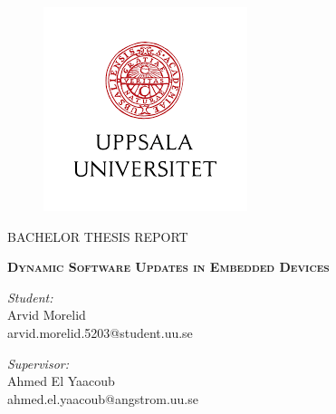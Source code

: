 
\begin{titlepage}

    \begin{figure}
        \begin{center}
            \includegraphics[scale=0.5]{img/UU_LOGO.png}
        \end{center}
    \end{figure}
    
    \thispagestyle{fancy}
    
    \vspace{1in}
    
    \center
    
    \textsc{\large BACHELOR THESIS REPORT} %
    
    \vspace{0.5in}
    
    \noindent\makebox[\linewidth]{\rule{\linewidth}{1.2pt}}
    \textsc{ \textbf{\large 
    Dynamic Software Updates in Embedded Devices
    }}
    \noindent\makebox[\linewidth]{\rule{\linewidth}{1.2pt}}
    
    \vspace{0.5in}
    
    \begin{minipage}{0.48\textwidth}
        \begin{flushleft}
            \textit{Student:} \\
            Arvid Morelid    \\
            arvid.morelid.5203@student.uu.se \\
        \end{flushleft}
    \end{minipage}
    \begin{minipage}{0.48\textwidth}
        \begin{flushright}
        \textit{Supervisor:} \\
        Ahmed El Yaacoub \\
        ahmed.el.yaacoub@angstrom.uu.se   \\
        \end{flushright}
    \end{minipage}
    

\end{titlepage}
